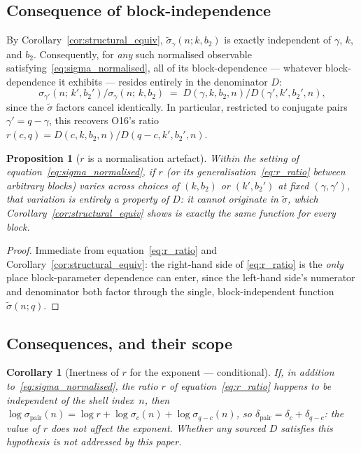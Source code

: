 \documentclass[11pt,a4paper]{article}
\newtheorem{proposition}[theorem]{Proposition}
\newtheorem{corollary}[theorem]{Corollary}
\theoremstyle{definition}
\begin{document}
  \subsection{Consequence of block-independence}

    By Corollary~\ref{cor:structural_equiv}, $\tilde\sigma_\gamma(n;k,b_2)$
    is exactly independent of $\gamma$, $k$, and $b_2$.
    Consequently, for \emph{any} such normalised observable
    satisfying~\eqref{eq:sigma_normalised}, all of its block-dependence ---
    whatever block-dependence it exhibits --- resides entirely in the
    denominator $D$:
    \begin{equation}
      \sigma_{\gamma'}(n;\,k',b_2') \big/ \sigma_\gamma(n;\,k,b_2)
      \;=\; D(\gamma,k,b_2,n) \big/ D(\gamma',k',b_2',n),
      \label{eq:r_ratio}
    \end{equation}
    since the $\tilde\sigma$ factors cancel identically.
    In particular, restricted to conjugate pairs $\gamma'=q-\gamma$, this
    recovers O16's ratio $r(c,q) = D(c,k,b_2,n)/D(q-c,k',b_2',n)$.

    \begin{proposition}[$r$ is a normalisation artefact]
      \label{prop:r_artefact}
      Within the setting of equation~\eqref{eq:sigma_normalised}, if $r$
      (or its generalisation~\eqref{eq:r_ratio} between arbitrary blocks)
      varies across choices of $(k,b_2)$ or $(k',b_2')$ at fixed
      $(\gamma,\gamma')$, that variation is entirely a property of $D$: it
      cannot originate in $\tilde\sigma$, which
      Corollary~\ref{cor:structural_equiv} shows is exactly the same
      function for every block.
    \end{proposition}

    \begin{proof}
      Immediate from equation~\eqref{eq:r_ratio} and
      Corollary~\ref{cor:structural_equiv}: the right-hand side of
      \eqref{eq:r_ratio} is the \emph{only} place block-parameter
      dependence can enter, since the left-hand side's numerator and
      denominator both factor through the single, block-independent
      function $\tilde\sigma(n;q)$.
    \end{proof}

  \subsection{Consequences, and their scope}

    \begin{corollary}[Inertness of $r$ for the exponent --- conditional]
      \label{cor:r_inert}
      \emph{If}, in addition to~\eqref{eq:sigma_normalised}, the ratio $r$
      of equation~\eqref{eq:r_ratio} happens to be independent of the
      shell index~$n$, \emph{then}
      $\log\sigma_{\mathrm{pair}}(n) = \log r + \log\sigma_c(n) + \log\sigma_{q-c}(n)$,
      so $\delta_{\mathrm{pair}} = \delta_c + \delta_{q-c}$: the value of
      $r$ does not affect the exponent.
      Whether any sourced $D$ satisfies this hypothesis is not addressed
      by this paper.
    \end{corollary}
\end{document}
